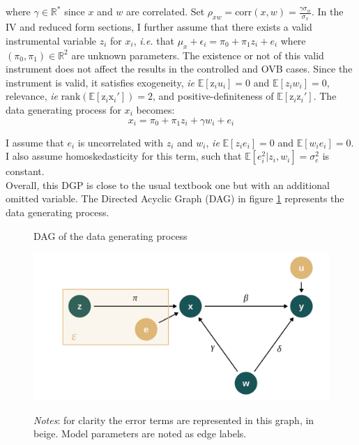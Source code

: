 \documentclass[usletter, 12pt]{article}
\begin{document}
				where $\gamma \in \mathbb{R}^{*}$ since $x$ and $w$ are correlated. Set $\rho_{xw} = \text{corr}(x, w) =  \frac{\gamma \sigma_{w}}{\sigma_{x}}$. In the IV and reduced form sections, I further assume that there exists a valid instrumental variable $z_i$ for $x_i$, \textit{i.e.} that $\mu_x + \epsilon_{i} = \pi_0 + \pi_1 z_i + e_{i}$  where $(\pi_0, \pi_1) \in \mathbb{R}^{2}$ are unknown parameters. The existence or not of this valid instrument does not affect the results in the controlled and \textsc{OVB} cases. Since the instrument is valid, it satisfies exogeneity, \textit{ie} $\mathbb{E}[\text{z}_{i}u_{i}] = 0$ and  $\mathbb{E}[z_{i}w_{i}] = 0$, relevance, \textit{ie} $\text{rank}(\mathbb{E}[\text{z}_{i}\text{x}_i']) = 2$,  and positive-definiteness of $\mathbb{E}[\text{z}_i \text{z}_i']$. The data generating process for $x_i$ becomes:			
				~
				\begin{equation}\label{maths_dgp_x_iv}
					x_i = \pi_0 + \pi_1 z_i + \gamma w_{i} + e_{i}
				\end{equation}
				
				I assume that $e_{i}$ is uncorrelated with $z_i$ and $w_{i}$, \textit{ie} $\mathbb{E}[z_ie_{i}] = 0$ and $\mathbb{E}[w_ie_{i}] = 0$. I also assume homoskedasticity for this term, such that $\mathbb{E}[e_{i}^{2} | z_{i}, w_{i}] = \sigma_{e}^{2}$ is constant.\\ %
				
				Overall, this DGP is close to the usual textbook one but with an additional omitted variable. The Directed Acyclic Graph (DAG) in figure \ref{DAG} represents the data generating process.
			
			 \begin{figure}[!h] 
                    			\begin{center}
                    				\caption{DAG of the data generating process}
                    				\label{DAG}
                    				\includegraphics[width=0.6\linewidth]{images/DAG_maths.png}
                                   \caption*{\footnotesize \textit{Notes}: for clarity the error terms are represented in this graph, in beige. Model parameters are noted as edge labels.}
                                    \end{center}
				\vspace{-1cm}
                    		\end{figure} 
\end{document}
